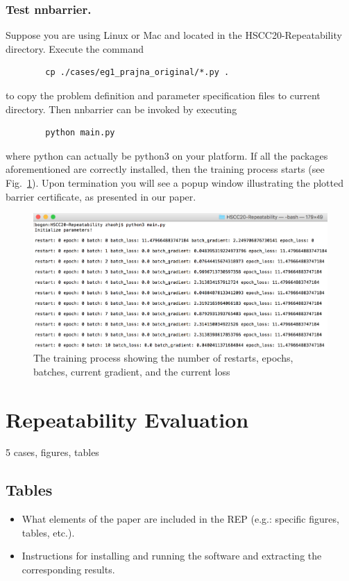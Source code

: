 \documentclass{llncs}
\begin{document}
\subsubsection{Test \textsf{nnbarrier}.} Suppose you are using Linux or Mac and located in the \textsf{HSCC20-Repeatability} directory. Execute the command
\begin{verbatim}              
        cp ./cases/eg1_prajna_original/*.py .
\end{verbatim}
to copy the problem definition and parameter specification files to current directory. Then \textsf{nnbarrier} can be invoked by executing
\begin{verbatim}              
        python main.py
\end{verbatim}
where \textsf{python} can actually be \textsf{python3} on your platform. If all the packages aforementioned are correctly 
installed, then the training process starts (see Fig.~\ref{fig:train-process}). Upon termination you will see a popup window illustrating the plotted barrier certificate,
as presented in our paper.
\begin{figure}[t]
    \includegraphics[width=\textwidth]{./fig/training-process}
    \caption{The training process showing the number of restarts, epochs, batches, current gradient, and the current loss} \label{fig:train-process}
\end{figure}

\section{Repeatability Evaluation}

5 cases, figures, tables

\subsection{Tables}

\begin{itemize}
    \item What elements of the paper are included in the REP (e.g.: specific figures, tables, etc.).
    \item Instructions for installing and running the software and extracting the corresponding results. 
\end{itemize}
\end{document}
